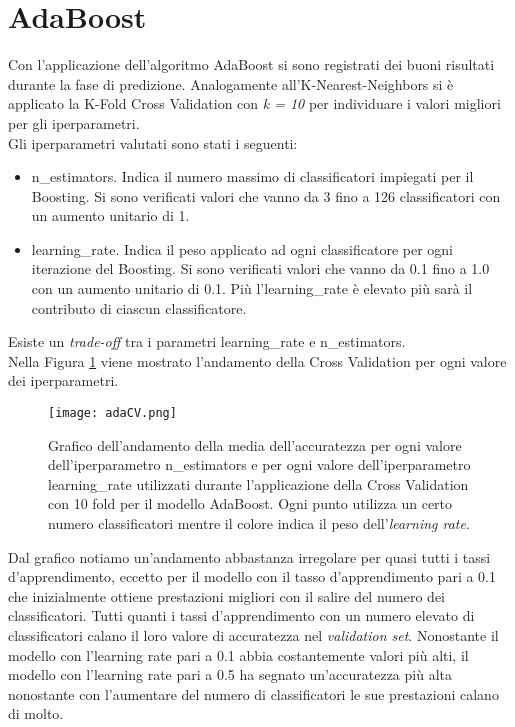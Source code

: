 \section{AdaBoost}
Con l'applicazione dell'algoritmo AdaBoost si sono registrati dei buoni risultati durante la fase di predizione. Analogamente all'K-Nearest-Neighbors si è applicato la K-Fold Cross Validation con \emph{k = 10} per individuare i valori migliori per gli iperparametri.\\
Gli iperparametri valutati sono stati i seguenti:
\begin{itemize}
	\item \textsf{n\_estimators}. Indica il numero massimo di classificatori impiegati per il Boosting. Si sono verificati valori che vanno da 3 fino a 126 classificatori con un aumento unitario di 1.
	\item \textsf{learning\_rate}. Indica il peso applicato ad ogni classificatore per ogni iterazione del Boosting. Si sono verificati valori che vanno da 0.1 fino a 1.0 con un aumento unitario di 0.1. Più l'\textsf{learning\_rate} è elevato più sarà il contributo di ciascun classificatore.
\end{itemize}
Esiste un \emph{trade-off} tra i parametri \textsf{learning\_rate} e \textsf{n\_estimators}.\\
Nella Figura \ref{fig:adaCV} viene mostrato l'andamento della Cross Validation per ogni valore dei iperparametri.
\begin{figure}[h]
	\begin{center}
		\texttt{[image: adaCV.png]}
		\caption{Grafico dell'andamento della media dell'accuratezza per ogni valore dell'iperparametro \textsf{n\_estimators} e per ogni valore dell'iperparametro \textsf{learning\_rate} utilizzati durante l'applicazione della Cross Validation con 10 fold per il modello AdaBoost. Ogni punto utilizza un certo numero classificatori mentre il colore indica il peso dell'\emph{learning rate}.
		} 
		\label{fig:adaCV}
	\end{center}
\end{figure}
Dal grafico notiamo un'andamento abbastanza irregolare per quasi tutti i tassi d'apprendimento, eccetto per il modello con il tasso d'apprendimento pari a 0.1 che inizialmente ottiene prestazioni migliori con il salire del numero dei classificatori. Tutti quanti i tassi d'apprendimento con un numero elevato di classificatori calano il loro valore di accuratezza nel \emph{validation set}. Nonostante il modello con l'learning rate pari a 0.1 abbia costantemente valori più alti, il modello con l'learning rate pari a 0.5 ha segnato un'accuratezza più alta nonostante con l'aumentare del numero di classificatori le sue prestazioni calano di molto. \\
